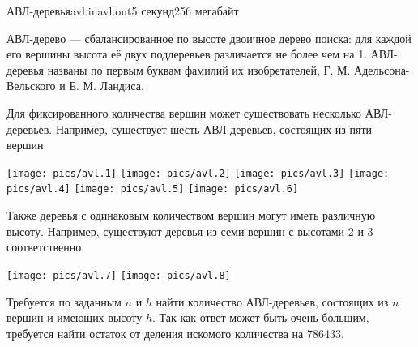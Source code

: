 \begin{problem}{АВЛ-деревья}{avl.in}{avl.out}{5 секунд}{256 мегабайт}


АВЛ-дерево --- сбалансированное по высоте двоичное дерево поиска:
для каждой его вершины высота её двух поддеревьев различается не более чем на 1.
АВЛ-деревья названы по первым буквам фамилий их изобретателей,
Г. М. Адельсона-Вельского и Е. М. Ландиса.

Для фиксированного количества вершин может существовать несколько АВЛ-деревьев.
Например, существует шесть АВЛ-деревьев, состоящих из пяти вершин.

\begin{center}
\texttt{[image: pics/avl.1]}\hspace{0.5cm}
\texttt{[image: pics/avl.2]}\hspace{0.5cm}
\texttt{[image: pics/avl.3]}\hspace{0.5cm}
\texttt{[image: pics/avl.4]}\hspace{0.5cm}
\texttt{[image: pics/avl.5]}\hspace{0.5cm}
\texttt{[image: pics/avl.6]}
\end{center}

Также деревья с одинаковым количеством вершин могут иметь различную высоту.
Например, существуют деревья из семи вершин с высотами 2 и 3 соответственно.

\begin{center}
\texttt{[image: pics/avl.7]}\hspace{0.5cm}
\texttt{[image: pics/avl.8]}
\end{center}

Требуется по заданным $n$ и $h$ найти количество АВЛ-деревьев, состоящих из
$n$ вершин и имеющих высоту $h$. Так как ответ может быть очень большим,
требуется найти остаток от деления искомого количества на 786433.


\end{problem}
